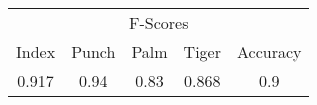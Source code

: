 \documentclass{standalone}
\begin{document}
 
 \begin{tabular}{|c|c|c|c ||c|}
\cline{1-5}\multicolumn{5}{|c|}{F-Scores} \\ 
\cline{1-5}Index & Punch & Palm & Tiger & Accuracy\\ 
\cline{1-5}0.917 & 0.94 & 0.83 & 0.868 & 0.9\\ 
 \cline{1-5}\hline \end{tabular}
 
\end{document}
